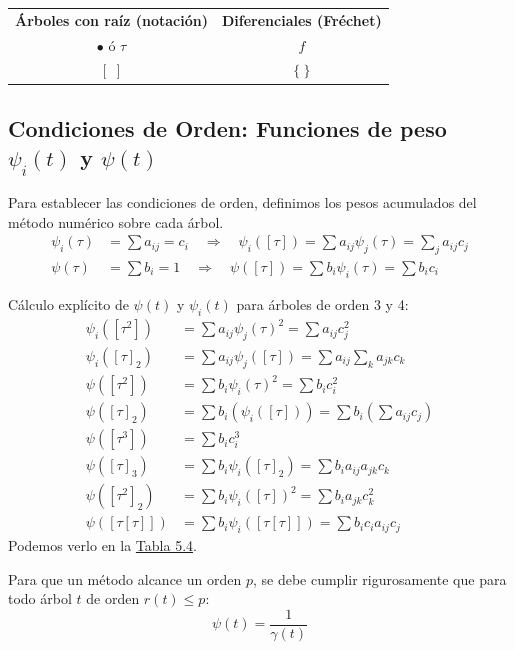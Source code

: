 \begin{center}
\begin{tabular}{cc}
\textbf{Árboles con raíz (notación)} & \textbf{Diferenciales (Fréchet)} \\
$\bullet \text{ ó } \tau$ & $f$ \\
$[\, \, ]$ & $\{\ \}$
\end{tabular}
\end{center}

\subsection{Condiciones de Orden: Funciones de peso $\psi_i(t)$ y $\psi(t)$}

Para establecer las condiciones de orden, definimos los pesos acumulados del método numérico sobre cada árbol.
\begin{align*}
    \psi_i(\tau) &= \sum a_{ij} = c_i \quad \Rightarrow \quad \psi_i([\tau]) = \sum a_{ij} \psi_j(\tau) = \sum_{j} a_{ij} c_j \\
    \psi(\tau) &= \sum b_i = 1 \quad \Rightarrow \quad \psi([\tau]) = \sum b_i \psi_i(\tau) = \sum b_i c_i
\end{align*}

C\'alculo expl\'icito de $\psi(t)$ y $\psi_i(t)$ para árboles de orden 3 y 4:
\begin{align*}
    \psi_i([\tau^2]) &= \sum a_{ij} \psi_j(\tau)^2 = \sum a_{ij} c_j^2 \\
    \psi_i([\tau]_2) &= \sum a_{ij} \psi_j([\tau]) = \sum a_{ij} \sum_{k} a_{jk} c_k \\
    \psi([\tau^2]) &= \sum b_i \psi_i(\tau)^2 = \sum b_i c_i^2 \\
    \psi([\tau]_2) &= \sum b_i \left(\psi_i([\tau])\right) = \sum b_i \left(\sum a_{ij} c_j\right) \\
    \psi([\tau^3]) &= \sum b_i c_i^3 \\
    \psi([\tau]_3) &= \sum b_i \psi_i([\tau]_2) = \sum b_i a_{ij} a_{jk} c_k \\
    \psi([\tau^2]_2) &= \sum b_i \psi_i([\tau])^2 = \sum b_i a_{jk} c_k^2 \\
    \psi([\tau[\tau]]) &= \sum b_i \psi_i([\tau[\tau]]) = \sum b_i c_i a_{ij} c_j
\end{align*}
Podemos verlo en la \hyperref[ap1]{Tabla 5.4}. 

Para que un método alcance un orden $p$, se debe cumplir rigurosamente que para todo árbol $t$ de orden $r(t) \le p$:
$$ \psi(t) = \frac{1}{\gamma(t)} $$

